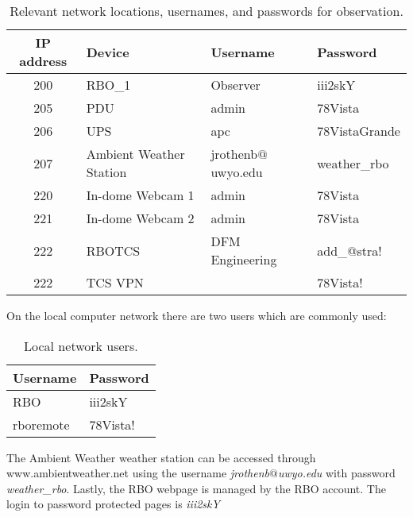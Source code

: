 \documentclass[letterpaper,12pt]{article}
\begin{document}
\begin{table}[H]
	\caption{\label{tab:users}Relevant network locations, usernames, and passwords for observation.}
	\begin{center}
			\begin{tabular}{c|l|l|l}
				IP address	& Device	& Username	& Password \\\hline
				200 		& RBO\_1 	& Observer	& iii2skY \\
				205 		& PDU 		& admin 	& 78Vista \\
				206 		& UPS 		& apc 		& 78VistaGrande \\
				207		& Ambient Weather Station	& jrothenb$@$uwyo.edu	& weather\_rbo\\
				220 		& In-dome Webcam 1 	& admin		& 78Vista \\
				221 		& In-dome Webcam 2	& admin		& 78Vista \\
				222 		& RBOTCS	& DFM Engineering & add\_@stra!\\
				222			& TCS VPN	& 			& 78Vista!
			\end{tabular}
	\end{center}
\end{table}

On the local computer network there are two users which are commonly used:
\begin{table}[H]
	\caption{\label{tab:comp}Local network users.}
	\begin{center}
		\begin{tabular}{l|l}
			Username	& Password\\\hline
			RBO			& iii2skY\\
			rboremote	& 78Vista!
		\end{tabular}
	\end{center}
\end{table}

The Ambient Weather weather station can be accessed through www.ambientweather.net using the username \textit{jrothenb$@$uwyo.edu} with password \textit{weather\_rbo}.
Lastly, the RBO webpage is managed by the RBO account. The login to password protected pages is \textit{iii2skY}
\end{document}
